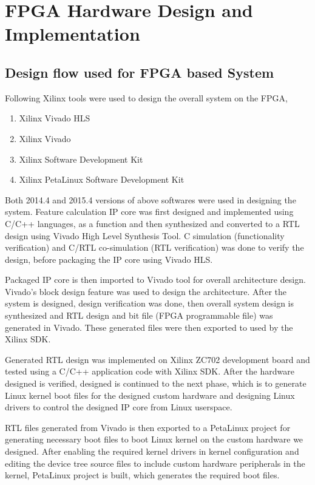 \documentclass[12pt,a4paper]{report}
\begin{document}
\section{FPGA Hardware Design and Implementation}
\subsection{Design flow used for FPGA based System}
Following Xilinx tools were used to design the overall system on the FPGA,
\begin{enumerate}
\item Xilinx Vivado HLS
\item Xilinx Vivado
\item Xilinx Software Development Kit
\item Xilinx PetaLinux Software Development Kit
\end{enumerate}
Both 2014.4 and 2015.4 versions of above softwares were used in designing the system. Feature calculation IP core was first designed and implemented using C/C++ languages, as a function and then synthesized and converted to a RTL design using Vivado High Level Synthesis Tool. C simulation (functionality verification) and C/RTL co-simulation (RTL verification) was done to verify the design, before packaging the IP core using Vivado HLS.

\par Packaged IP core is then imported to Vivado tool for overall architecture design. Vivado’s block design feature was used to design the architecture.  After the system is designed, design verification was done, then overall system design is synthesized and RTL design and bit file (FPGA programmable file) was generated in Vivado. These generated files were then exported to used by the Xilinx SDK.

\par Generated RTL design was implemented on Xilinx ZC702 development board and tested using a C/C++ application code with Xilinx SDK. After the hardware designed is verified, designed is continued to the next phase, which is to generate Linux kernel boot files for the designed custom hardware and designing Linux drivers to control the designed IP core from Linux userspace.

\par RTL files generated from Vivado is then exported to a PetaLinux project for generating necessary boot files to boot Linux kernel on the custom hardware we designed. After enabling the required kernel drivers in kernel configuration and editing the device tree source files to include custom hardware peripherals in the kernel, PetaLinux project is built, which generates the required boot files. 
\end{document}
